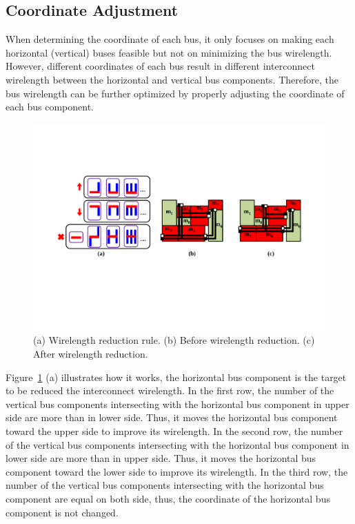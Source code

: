 \subsection{Coordinate Adjustment}
\label{sec::Coordinate Adjustment}
When determining the coordinate of each bus, it only focuses on
making each horizontal (vertical) buses feasible but not on
minimizing the bus wirelength. However, different coordinates of
each bus result in different interconnect wirelength
between the horizontal and vertical bus components.
Therefore, the bus wirelength can be further optimized
by properly adjusting the coordinate of each bus component.

\begin{figure}[htb]
  \centering
    \includegraphics[width=14cm]{Fig/coordinate_adjustment.pdf}
     \caption{
       (a) Wirelength reduction rule. (b) Before wirelength reduction. (c) After wirelength reduction.
   }
  \label{fig::coordinate_adjustment}
\end{figure}

Figure~\ref{fig::coordinate_adjustment}
(a) illustrates how it works, the horizontal bus component is the target to
be reduced the interconnect wirelength. In the first row, the number of the
vertical bus components intersecting with the horizontal bus component in upper side are
more than in lower side. Thus, it moves the horizontal bus component toward
the upper side to improve its wirelength. In the second row, the
number of the vertical bus components intersecting with the horizontal bus component in
lower side are more than in upper side. Thus, it moves the
horizontal bus component toward the lower side to improve its wirelength. In
the third row, the number of the vertical bus components intersecting with the
horizontal bus component are equal on both side, thus, the coordinate of the horizontal
bus component is not changed.

